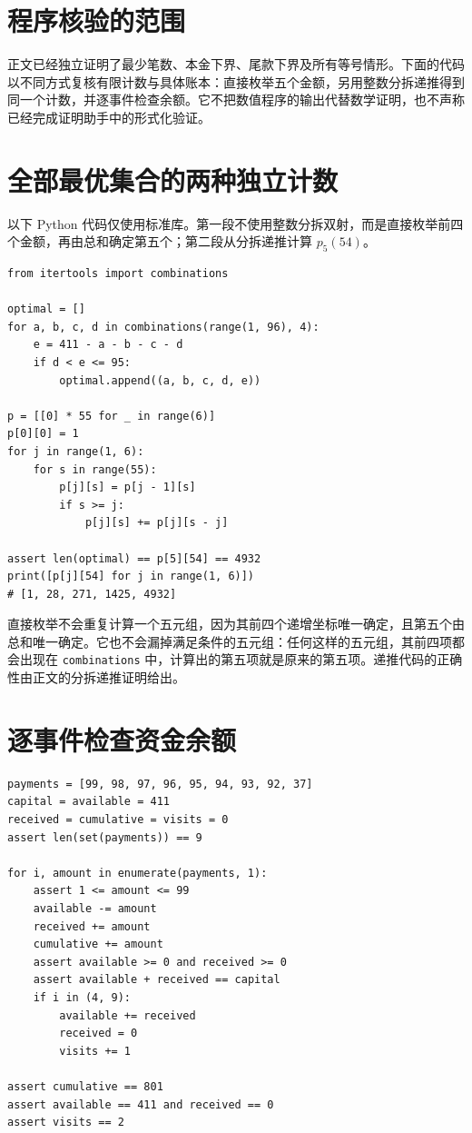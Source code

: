 \documentclass[UTF8,a4paper]{ctexbook}
\theoremstyle{definition}
\numberwithin{equation}{chapter}
\newcommand{\1}{\mathbf{1}}
\begin{document}
\section{程序核验的范围}
正文已经独立证明了最少笔数、本金下界、尾款下界及所有等号情形。下面的代码以不同方式复核有限计数与具体账本：直接枚举五个金额，另用整数分拆递推得到同一个计数，并逐事件检查余额。它不把数值程序的输出代替数学证明，也不声称已经完成证明助手中的形式化验证。

\section{全部最优集合的两种独立计数}
以下 Python 代码仅使用标准库。第一段不使用整数分拆双射，而是直接枚举前四个金额，再由总和确定第五个；第二段从分拆递推计算 $p_5(54)$。
\begin{Verbatim}[fontsize=\small,frame=single]
from itertools import combinations

optimal = []
for a, b, c, d in combinations(range(1, 96), 4):
    e = 411 - a - b - c - d
    if d < e <= 95:
        optimal.append((a, b, c, d, e))

p = [[0] * 55 for _ in range(6)]
p[0][0] = 1
for j in range(1, 6):
    for s in range(55):
        p[j][s] = p[j - 1][s]
        if s >= j:
            p[j][s] += p[j][s - j]

assert len(optimal) == p[5][54] == 4932
print([p[j][54] for j in range(1, 6)])
# [1, 28, 271, 1425, 4932]
\end{Verbatim}

直接枚举不会重复计算一个五元组，因为其前四个递增坐标唯一确定，且第五个由总和唯一确定。它也不会漏掉满足条件的五元组：任何这样的五元组，其前四项都会出现在 \texttt{combinations} 中，计算出的第五项就是原来的第五项。递推代码的正确性由正文的分拆递推证明给出。

\clearpage
\section{逐事件检查资金余额}
\begin{Verbatim}[fontsize=\small,frame=single]
payments = [99, 98, 97, 96, 95, 94, 93, 92, 37]
capital = available = 411
received = cumulative = visits = 0
assert len(set(payments)) == 9

for i, amount in enumerate(payments, 1):
    assert 1 <= amount <= 99
    available -= amount
    received += amount
    cumulative += amount
    assert available >= 0 and received >= 0
    assert available + received == capital
    if i in (4, 9):
        available += received
        received = 0
        visits += 1

assert cumulative == 801
assert available == 411 and received == 0
assert visits == 2
\end{Verbatim}
\end{document}
